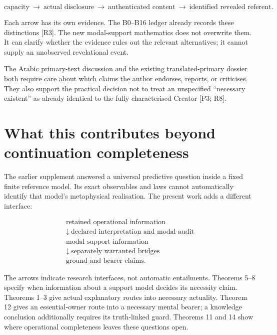 \documentclass[11pt,a4paper]{article}
\begin{document}
\nopagebreak[4]

\[
\text{capacity}\ \to\ \text{actual disclosure}\ \to\
\text{authenticated content}\ \to\ \text{identified revealed referent}.
\]

Each arrow has its own evidence. The B0--B16 ledger already records
these distinctions {[}R3{]}. The new modal-support mathematics does not
overwrite them. It can clarify whether the evidence rules out the
relevant alternatives; it cannot supply an unobserved revelational
event.

The Arabic primary-text discussion and the existing translated-primary
dossier both require care about which claims the author endorses,
reports, or criticises. They also support the practical decision not to
treat an unspecified ``necessary existent'' as already identical to the
fully characterised Creator {[}P3; R8{]}.

\section{What this contributes beyond continuation
completeness}\label{what-this-contributes-beyond-continuation-completeness}

The earlier supplement answered a universal predictive question inside a
fixed finite reference model. Its exact observables and laws cannot
automatically identify that model's metaphysical realisation. The
present work adds a different interface:

\nopagebreak[4]

\[
\begin{gathered}
\text{retained operational information}\\
\downarrow\ \text{declared interpretation and modal audit}\\
\text{modal support information}\\
\downarrow\ \text{separately warranted bridges}\\
\text{ground and bearer claims}.
\end{gathered}
\]

The arrows indicate research interfaces, not automatic entailments.
Theorems 5--8 specify when information about a support model decides its
necessity claim. Theorems 1--3 give actual explanatory routes into
necessary actuality. Theorem 12 gives an essential-owner route into a
necessary mental bearer; a knowledge conclusion additionally requires
its truth-linked guard. Theorems 11 and 14 show where operational
completeness leaves these questions open.
\end{document}
